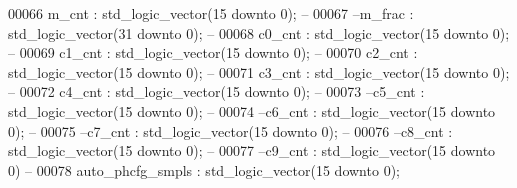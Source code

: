 \begin{DoxyCode}
00066       \textcolor{vhdlchar}{m_cnt}             \textcolor{vhdlchar}{:} \textcolor{comment}{std\_logic\_vector}\textcolor{vhdlchar}{(}\textcolor{vhdllogic}{}\textcolor{vhdllogic}{15} \textcolor{keywordflow}{downto} \textcolor{vhdllogic}{}\textcolor{vhdllogic}{0}\textcolor{vhdlchar}{)};\textcolor{keyword}{ -- }
00067 \textcolor{keyword}{      --m\_frac          : std\_logic\_vector(31 downto 0); -- }
00068       \textcolor{vhdlchar}{c0_cnt}            \textcolor{vhdlchar}{:} \textcolor{comment}{std\_logic\_vector}\textcolor{vhdlchar}{(}\textcolor{vhdllogic}{}\textcolor{vhdllogic}{15} \textcolor{keywordflow}{downto} \textcolor{vhdllogic}{}\textcolor{vhdllogic}{0}\textcolor{vhdlchar}{)};\textcolor{keyword}{ -- }
00069       \textcolor{vhdlchar}{c1_cnt}            \textcolor{vhdlchar}{:} \textcolor{comment}{std\_logic\_vector}\textcolor{vhdlchar}{(}\textcolor{vhdllogic}{}\textcolor{vhdllogic}{15} \textcolor{keywordflow}{downto} \textcolor{vhdllogic}{}\textcolor{vhdllogic}{0}\textcolor{vhdlchar}{)};\textcolor{keyword}{ -- }
00070       \textcolor{vhdlchar}{c2_cnt}            \textcolor{vhdlchar}{:} \textcolor{comment}{std\_logic\_vector}\textcolor{vhdlchar}{(}\textcolor{vhdllogic}{}\textcolor{vhdllogic}{15} \textcolor{keywordflow}{downto} \textcolor{vhdllogic}{}\textcolor{vhdllogic}{0}\textcolor{vhdlchar}{)};\textcolor{keyword}{ -- }
00071       \textcolor{vhdlchar}{c3_cnt}            \textcolor{vhdlchar}{:} \textcolor{comment}{std\_logic\_vector}\textcolor{vhdlchar}{(}\textcolor{vhdllogic}{}\textcolor{vhdllogic}{15} \textcolor{keywordflow}{downto} \textcolor{vhdllogic}{}\textcolor{vhdllogic}{0}\textcolor{vhdlchar}{)};\textcolor{keyword}{ -- }
00072       \textcolor{vhdlchar}{c4_cnt}            \textcolor{vhdlchar}{:} \textcolor{comment}{std\_logic\_vector}\textcolor{vhdlchar}{(}\textcolor{vhdllogic}{}\textcolor{vhdllogic}{15} \textcolor{keywordflow}{downto} \textcolor{vhdllogic}{}\textcolor{vhdllogic}{0}\textcolor{vhdlchar}{)};\textcolor{keyword}{ -- }
00073 \textcolor{keyword}{      --c5\_cnt          : std\_logic\_vector(15 downto 0); -- }
00074 \textcolor{keyword}{      --c6\_cnt          : std\_logic\_vector(15 downto 0); -- }
00075 \textcolor{keyword}{      --c7\_cnt          : std\_logic\_vector(15 downto 0); -- }
00076 \textcolor{keyword}{      --c8\_cnt          : std\_logic\_vector(15 downto 0); -- }
00077 \textcolor{keyword}{      --c9\_cnt          : std\_logic\_vector(15 downto 0) --}
00078       \textcolor{vhdlchar}{auto_phcfg_smpls}  \textcolor{vhdlchar}{:} \textcolor{comment}{std\_logic\_vector}\textcolor{vhdlchar}{(}\textcolor{vhdllogic}{}\textcolor{vhdllogic}{15} \textcolor{keywordflow}{downto} \textcolor{vhdllogic}{}\textcolor{vhdllogic}{0}\textcolor{vhdlchar}{)};

\end{DoxyCode}
